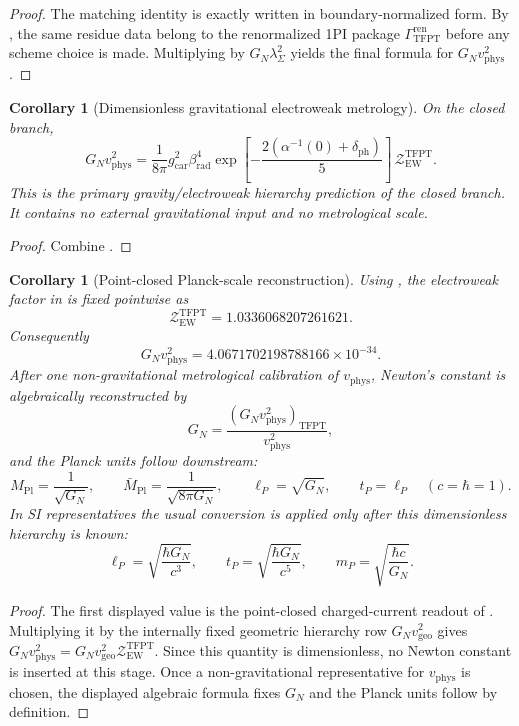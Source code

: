 \documentclass[11pt,a4paper]{article}
\newtheorem{corollary}[theorem]{Corollary}
\theoremstyle{definition}
\theoremstyle{remark}
\newcommand{\Mpl}{\bar M_{\mathrm{Pl}}}
\newcommand{\gcar}{g_{\mathrm{car}}}
\newcommand{\vgeo}{v_{\mathrm{geo}}}
\begin{document}
\begin{proof}
The matching identity is exactly  written in
boundary-normalized form. By , the same residue data belong to
the renormalized 1PI package $\Gamma_{\mathrm{TFPT}}^{\mathrm{ren}}$ before any scheme choice is
made. Multiplying by $G_N\lambda_\Sigma^2$ yields the final formula for $G_Nv_{\mathrm{phys}}^2$.
\end{proof}

\begin{corollary}[Dimensionless gravitational electroweak metrology]
\label{cor:dimensionless-gravitational-ew-metrology}
On the closed branch,
\[
G_Nv_{\mathrm{phys}}^2
=
\frac{1}{8\pi}\gcar^2\beta_{\mathrm{rad}}^4
\exp\!\left[-\frac{2(\alpha^{-1}(0)+\delta_{\mathrm{ph}})}{5}\right]
\,\mathcal Z_{\mathrm{EW}}^{\mathrm{TFPT}}.
\]
This is the primary gravity/electroweak hierarchy prediction of the closed branch. It contains no
external gravitational input and no metrological scale.
\end{corollary}

\begin{proof}
Combine .
\end{proof}

\begin{corollary}[Point-closed Planck-scale reconstruction]
\label{cor:point-closed-planck-reconstruction}
Using , the electroweak factor in
 is fixed pointwise as
\[
\mathcal Z_{\mathrm{EW}}^{\mathrm{TFPT}}
=
1.0336068207261621.
\]
Consequently
\[
G_Nv_{\mathrm{phys}}^2
=
4.0671702198788166\times10^{-34}.
\]
After one non-gravitational metrological calibration of $v_{\mathrm{phys}}$, Newton's constant is
algebraically reconstructed by
\[
G_N=
\frac{(G_Nv_{\mathrm{phys}}^2)_{\mathrm{TFPT}}}{v_{\mathrm{phys}}^2},
\]
and the Planck units follow downstream:
\[
M_{\mathrm{Pl}}=\frac{1}{\sqrt{G_N}},
\qquad
\Mpl=\frac{1}{\sqrt{8\pi G_N}},
\qquad
\ell_P=\sqrt{G_N},
\qquad
t_P=\ell_P
\quad(c=\hbar=1).
\]
In SI representatives the usual conversion is applied only after this dimensionless hierarchy is
known:
\[
\ell_P=\sqrt{\frac{\hbar G_N}{c^3}},
\qquad
t_P=\sqrt{\frac{\hbar G_N}{c^5}},
\qquad
m_P=\sqrt{\frac{\hbar c}{G_N}}.
\]
\end{corollary}

\begin{proof}
The first displayed value is the point-closed charged-current readout of
. Multiplying it by the internally fixed geometric hierarchy
row $G_N\vgeo^2$ gives $G_Nv_{\mathrm{phys}}^2=G_N\vgeo^2\mathcal Z_{\mathrm{EW}}^{\mathrm{TFPT}}$.
Since this quantity is dimensionless, no Newton constant is inserted at this stage. Once a
non-gravitational representative for $v_{\mathrm{phys}}$ is chosen, the displayed algebraic formula
fixes $G_N$ and the Planck units follow by definition.
\end{proof}
\end{document}
